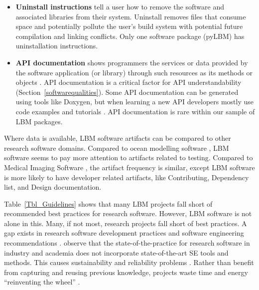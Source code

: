 \documentclass[final, 3p, times, authoryear]{elsarticle}
\begin{document}
\begin{itemize}
\item \textbf{Uninstall instructions} tell a user how to remove the software and
associated libraries from their system.  Uninstall removes files that consume
space and potentially pollute the user's build system with potential future
compilation and linking conflicts.  Only one software package (pyLBM) has
uninstallation instructions.

\item \textbf{API documentation} shows programmers the services or data provided
by the software application (or library) through such resources as its methods
or objects \citep{MengEtAl2018}.  API documentation is a critical factor for API
understandability \citep{MengEtAl2018} (Section~\ref{softwarequalities}). Some
API documentation can be generated using tools like Doxygen, but when learning a
new API developers mostly use code examples and tutorials \citep{MengEtAl2018}.
API documentation is rare within our sample of LBM packages.

\end{itemize}

Where data is available, LBM software artifacts can be compared to other
research software domains.  Compared to ocean modelling software
\citep{JungEtAl2022}, LBM software seems to pay more attention to artifacts
related to testing.  Compared to Medical Imaging Software \citep{Dong2021}, the
artifact frequency is similar, except LBM software is more likely to have
developer related artifacts, like Contributing, Dependency list, and Design
documentation.

Table~\ref{Tbl_Guidelines} shows that many LBM projects fall short of
recommended best practices for research software.  However, LBM software is not
alone in this.  Many, if not most, research projects fall short of best
practices.  A gap exists in research software development practices and software
engineering recommendations \citep{Storer2017, Kelly2007, OwojaiyeEtAl2021_CSE}.
\citet{JohansonAndHasselbring2018} observe that the state-of-the-practice for
research software in industry and academia does not incorporate state-of-the-art
SE tools and methods.  This causes sustainability and reliability problems
\citep{FaulkEtAl2009}. Rather than benefit from capturing and reusing previous
knowledge, projects waste time and energy ``reinventing the wheel''
\citep{deSouzaEtAl2019}. 
\end{document}

